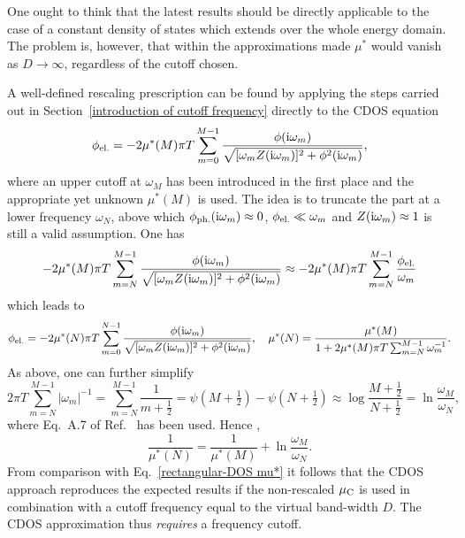 One ought to think that the latest results should be directly applicable to the
case of a constant density of states which extends over the whole energy domain.
The problem is, however, that within the approximations made $\mu^*$ would
vanish as $D \rightarrow \infty$, regardless of the cutoff chosen.

A well-defined rescaling prescription can be found by applying the steps carried
out in Section~\ref{introduction of cutoff frequency} directly to the CDOS
 equation
%
\begin{equation} \label{approximate constant Coulomb contribution}
    \phi \sb{\text{el.}} = -2 \mu^*(M) \pi T \sum_{m = 0}^{M - 1}
    \frac
        {\phi(\mathrm i \omega_m)}
        {\sqrt{[\omega_m Z(\mathrm i \omega_m)]^2 + \phi^2(\mathrm i \omega_m)}},
\end{equation}
%
where an upper cutoff at $\omega_M$ has been introduced in the first place and
the appropriate yet unknown $\mu^*(M)$ is used. The idea is to truncate the
 part at a lower frequency $\omega_N$, above which $\phi \sb{\text{ph.}}
(\mathrm i \omega_m) \approx 0$, $\phi \sb{\text{el.}} \ll \omega_m$ and $Z(\mathrm i \omega_m)
\approx 1$ is still a valid assumption. One has
%
\begin{equation*}
    -2 \mu^*(M) \pi T \sum_{m = N}^{M - 1}
    \frac
        {\phi(\mathrm i \omega_m)}
        {\sqrt{[\omega_m Z(\mathrm i \omega_m)]^2 + \phi^2(\mathrm i \omega_m)}}
    \approx -2 \mu^*(M) \pi T \sum_{m = N}^{M - 1}
    \frac{\phi \sb{\text{el.}}}{\omega_m}
\end{equation*}
%
which leads to
%
\begin{equation*}
    \phi \sb{\text{el.}} = -2 \mu^*(N) \pi T \sum_{m = 0}^{N - 1}
    \frac
        {\phi(\mathrm i \omega_m)}
        {\sqrt{[\omega_m Z(\mathrm i \omega_m)]^2 + \phi^2(\mathrm i \omega_m)}},
    \quad
    \mu^*(N) = \frac{\mu^*(M)}{1 + 2 \mu^*(M) \pi T
    \sum_{m = N}^{M - 1} \omega_m^{-1}}.
\end{equation*}
%
As above, one can further simplify
%
\begin{equation*}
    2 \pi T \sum_{m = N}^{M - 1} |\omega_m|^{-1}
    = \sum_{m = N}^{M - 1} \frac 1 {m + \frac 1 2}
    = \psi(M + \tfrac 1 2) - \psi(N + \tfrac 1 2)
    \approx \log \frac{M + \frac 1 2}{N + \frac 1 2}
    = \ln \frac{\omega_M}{\omega_N},
\end{equation*}
%
where Eq.~A.7 of Ref.~ has been used. Hence
\cite[Eq.~9.14]{AllenMitrovic82},
%
\begin{equation*}
    \frac 1 {\mu^*(N)} = \frac 1 {\mu^*(M)} + \ln \frac{\omega_M}{\omega_N}.
\end{equation*}
%
From comparison with Eq.~\ref{rectangular-DOS mu*} it follows that the CDOS
approach reproduces the expected results if the non-rescaled $\mu \sb{\text{C}}$ is
used in combination with a cutoff frequency equal to the virtual band-width $D$.
The CDOS approximation thus \emph{requires} a frequency cutoff.

